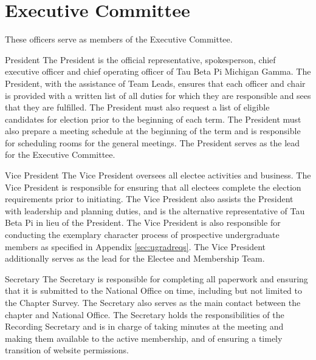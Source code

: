 \section{Executive Committee}\label{sec:ExecComm}
These officers serve as members of the Executive Committee.
\begin{enumsubsection}
\item{President} The President is the official representative, spokesperson, chief executive officer and chief operating officer of Tau Beta Pi Michigan Gamma. The President, with the assistance of Team Leads, ensures that each officer and chair is provided with a written list of all duties for which they are responsible and sees that they are fulfilled.  The President must also request a list of eligible candidates for election prior to the beginning of each term. The President must also prepare a meeting schedule at the beginning of the term and is responsible for scheduling rooms for the general meetings. The President serves as the lead for the Executive Committee. %

\item{Vice President} The Vice President oversees all electee activities and business. The Vice President is responsible for ensuring that all electees complete the election requirements prior to initiating. The Vice President also assists the President with leadership and planning duties, and is the alternative representative of Tau Beta Pi in lieu of the President. The Vice President is also responsible for conducting the exemplary character process of prospective undergraduate members as specified in Appendix \ref{sec:ugradreqs}. The Vice President additionally serves as the lead for the Electee and Membership Team.

\item{Secretary} The Secretary is responsible for completing all paperwork and ensuring that it is submitted to the National Office on time, including but not limited to the Chapter Survey. The Secretary also serves as the main contact between the chapter and National Office. The Secretary holds the responsibilities of the Recording Secretary and is in charge of taking minutes at the meeting and making them available to the active membership, and of ensuring a timely transition of website permissions. %


\end{enumsubsection}
